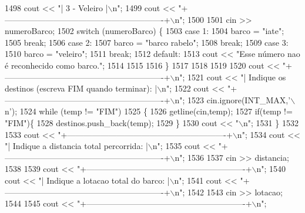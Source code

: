 \begin{DoxyCode}
1498     cout << \textcolor{stringliteral}{"| 3 - Veleiro                                              |\(\backslash\)n"};
1499     cout << \textcolor{stringliteral}{"+----------------------------------------------------------+\(\backslash\)n"};
1500 
1501     cin >> numeroBarco;
1502     \textcolor{keywordflow}{switch} (numeroBarco) \{
1503     \textcolor{keywordflow}{case} 1: 
1504         barco = \textcolor{stringliteral}{"iate"};
1505         \textcolor{keywordflow}{break};
1506     \textcolor{keywordflow}{case} 2:
1507         barco = \textcolor{stringliteral}{"barco rabelo"};
1508         \textcolor{keywordflow}{break};
1509     \textcolor{keywordflow}{case} 3:
1510         barco = \textcolor{stringliteral}{"veleiro"};
1511         \textcolor{keywordflow}{break};
1512     \textcolor{keywordflow}{default}:
1513         cout << \textcolor{stringliteral}{"Esse número nao é reconhecido como barco."};
1514         
1515 
1516     \}
1517 
1518 
1519 
1520     cout << \textcolor{stringliteral}{"+----------------------------------------------------------+\(\backslash\)n"};
1521     cout << \textcolor{stringliteral}{"| Indique os destinos (escreva FIM quando terminar):       |\(\backslash\)n"};
1522     cout << \textcolor{stringliteral}{"+----------------------------------------------------------+\(\backslash\)n"};
1523     cin.ignore(INT\_MAX,\textcolor{charliteral}{'\(\backslash\)n'});
1524     \textcolor{keywordflow}{while} (temp != \textcolor{stringliteral}{"FIM"})
1525     \{
1526         getline(cin,temp);
1527         \textcolor{keywordflow}{if}(temp != \textcolor{stringliteral}{"FIM"})\{
1528          destinos.push\_back(temp);
1529         \}
1530         cout << \textcolor{stringliteral}{"\(\backslash\)n"};
1531     \}
1532 
1533     cout << \textcolor{stringliteral}{"+----------------------------------------------------------+\(\backslash\)n"};
1534     cout << \textcolor{stringliteral}{"| Indique a distancia total percorrida:                    |\(\backslash\)n"};
1535     cout << \textcolor{stringliteral}{"+----------------------------------------------------------+\(\backslash\)n"};
1536 
1537     cin >> distancia;
1538 
1539     cout << \textcolor{stringliteral}{"+----------------------------------------------------------+\(\backslash\)n"};
1540     cout << \textcolor{stringliteral}{"| Indique a lotacao total do barco:                        |\(\backslash\)n"};
1541     cout << \textcolor{stringliteral}{"+----------------------------------------------------------+\(\backslash\)n"};
1542 
1543     cin >> lotacao;
1544 
1545     cout << \textcolor{stringliteral}{"+----------------------------------------------------------+\(\backslash\)n"};

\end{DoxyCode}
